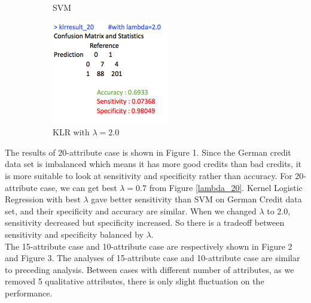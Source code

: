 \documentclass[11pt, oneside]{article}   	%
\newcommand{\reffig}[1]{Figure \ref{#1}\hspace{2pt}}
\begin{document}
\begin{figure}[H]
\begin{subfigure}[b]{0.475\textwidth}
            \caption{\small SVM}\label{svm_20}
        \end{subfigure}
        \hfil
        \begin{subfigure}[b]{0.475\textwidth}
            \centering
            \includegraphics[width=\textwidth, height=4.5cm]{klr_20}
            \caption{\small KLR with $\lambda=2.0$}\label{klr_20}
        \end{subfigure}
        \caption{}
\end{figure}
The results of 20-attribute case is shown in Figure 1. Since the German credit data set is imbalanced which means it has more good credits than bad credits, it is more suitable to look at sensitivity and specificity rather than accuracy. For 20-attribute case, we can get best $\lambda=0.7$ from \reffig{lambda_20}. Kernel Logistic Regression with best $\lambda$ gave better sensitivity than SVM on German Credit data set, and their specificity and accuracy are similar. When we changed $\lambda$ to 2.0, sensitivity decreased but specificity increased. So there is a tradeoff between sensitivity and specificity balanced by $\lambda$.\\

The 15-attribute case and 10-attribute case are respectively shown in Figure 2 and Figure 3. The analyses of 15-attribute case and 10-attribute case are similar to preceding analysis.  Between cases with different number of attributes, as we removed 5 qualitative attributes, there is only slight fluctuation on the performance.
\end{document}
